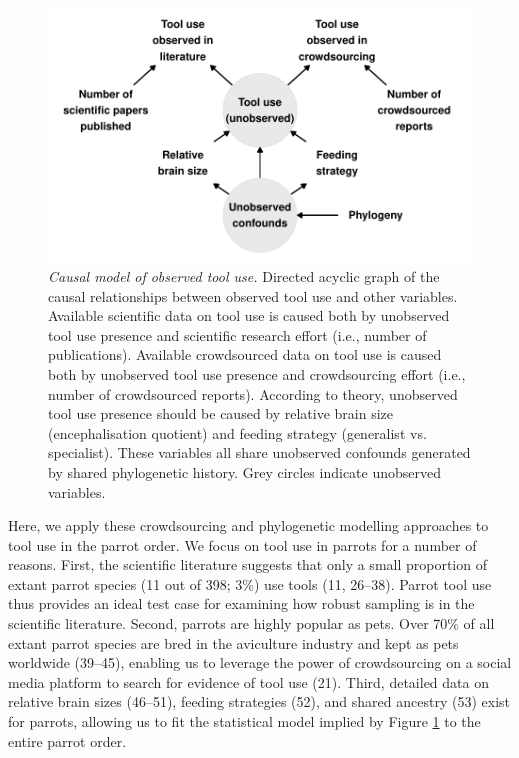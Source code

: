 \documentclass[
  man, donotrepeattitle,floatsintext]{apa6}
\begin{document}
\begin{figure}
\centering
\includegraphics{manuscript_files/figure-latex/plotDAG-1.pdf}
\caption{\label{fig:plotDAG}\emph{Causal model of observed tool use.} Directed acyclic graph
of the causal relationships between observed tool use and other variables.
Available scientific data on tool use is caused both by unobserved tool use
presence and scientific research effort (i.e., number of publications).
Available crowdsourced data on tool use is caused both by unobserved tool use
presence and crowdsourcing effort (i.e., number of crowdsourced reports).
According to theory, unobserved tool use presence should be caused by relative
brain size (encephalisation quotient) and feeding strategy (generalist vs.~
specialist). These variables all share unobserved confounds generated by shared
phylogenetic history. Grey circles indicate unobserved variables.}
\end{figure}

Here, we apply these crowdsourcing and phylogenetic modelling approaches to tool
use in the parrot order. We focus on tool use in parrots for a number of
reasons. First, the scientific literature suggests that only a small proportion
of extant parrot species (11 out of 398; 3\%) use tools
(11, 26--38). Parrot tool use
thus provides an ideal test case for examining how robust sampling is in the
scientific literature. Second, parrots are highly popular as pets. Over 70\% of
all extant parrot species are bred in the aviculture industry and kept as pets
worldwide (39--45), enabling us to leverage the power of crowdsourcing on a social
media platform to search for evidence of tool use (21). Third, detailed
data on relative brain sizes (46--51), feeding strategies (52), and
shared ancestry (53) exist for parrots, allowing us to fit the
statistical model implied by Figure \ref{fig:plotDAG} to the entire parrot
order.
\end{document}
